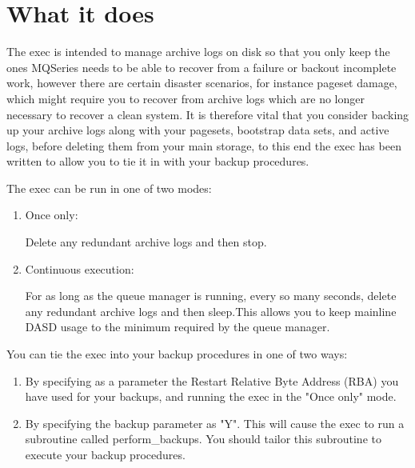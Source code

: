 \documentclass[a4paper,12pt]{report}
\begin{document}
\chapter{What it does}
The exec is intended to manage archive logs on disk so that you only
keep the ones MQSeries needs to be able to recover from a failure or
backout incomplete work, however there are certain disaster scenarios,
for instance pageset damage, which might require you to recover from
archive logs which are no longer necessary to recover a clean system.
It is therefore vital that you consider backing up your archive logs
along with your pagesets, bootstrap data sets, and active logs, before
deleting them from your main storage, to this end the exec has been
written to allow you to tie it in with your backup procedures.

The exec can be run in one of two modes:
\begin{enumerate}
\item Once only:

Delete any redundant archive logs and then stop.
\item Continuous execution:

For as long as the queue manager is running, every so many seconds,
delete any redundant archive logs and then sleep.This allows you to
keep mainline DASD usage to the minimum required by the queue manager.
\end{enumerate}

You can tie the exec into your backup procedures in one of two
ways:
\begin{enumerate}
\item By specifying as a parameter the Restart Relative Byte Address (RBA)
you have used for your backups, and running the exec in the "Once only"
mode.
\item By specifying the backup parameter as "Y".  This will cause the
exec to run a subroutine called perform\_backups.  You should tailor
this subroutine to execute your backup procedures.
\end{enumerate}
\end{document}
